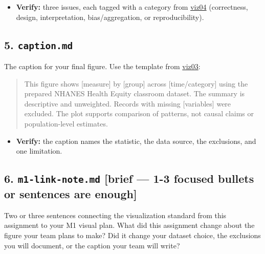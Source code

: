 \documentclass[
  letterpaper,
  DIV=11,
  numbers=noendperiod,
  oneside]{scrreprt}
\providecommand{\tightlist}{%
  \setlength{\itemsep}{0pt}\setlength{\parskip}{0pt}}
\begin{document}
\begin{itemize}
\tightlist
\item
  \textbf{Verify:} three issues, each tagged with a category from
  \hyperref[how-a-plot-can-mislead]{viz04} (correctness, design,
  interpretation, bias/aggregation, or reproducibility).
\end{itemize}

\subsection*{\texorpdfstring{5.
\texttt{caption.md}}{5. caption.md}}\label{caption.md}

The caption for your final figure. Use the template from
\hyperref[worked-example-descriptive-bmi-visualization]{viz03}:

\begin{quote}
This figure shows {[}measure{]} by {[}group{]} across
{[}time/category{]} using the prepared NHANES Health Equity classroom
dataset. The summary is descriptive and unweighted. Records with missing
{[}variables{]} were excluded. The plot supports comparison of patterns,
not causal claims or population-level estimates.
\end{quote}

\begin{itemize}
\tightlist
\item
  \textbf{Verify:} the caption names the statistic, the data source, the
  exclusions, and one limitation.
\end{itemize}

\subsection*{\texorpdfstring{6. \texttt{m1-link-note.md} {[}brief ---
1-3 focused bullets or sentences are enough{]}
}{6. m1-link-note.md {[}brief --- 1-3 focused bullets or sentences are enough{]} }}\label{m1-link-note.md-brief-1-3-focused-bullets-or-sentences-are-enough}

Two or three sentences connecting the visualization standard from this
assignment to your M1 visual plan. What did this assignment change about
the figure your team plans to make? Did it change your dataset choice,
the exclusions you will document, or the caption your team will write?
\end{document}

